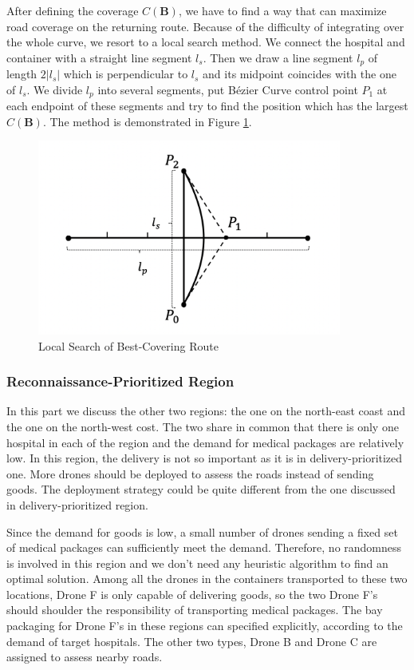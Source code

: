 \documentclass{mcmthesis}
\begin{document}
After defining the coverage $C(\mathbf{B})$, we have to find a way that can maximize road coverage on the returning route. Because of the difficulty of integrating over the whole curve, we resort to a local search method. We connect the hospital and container with a straight line segment $l_s$. Then we draw a line segment $l_p$ of length $2|l_s|$ which is perpendicular to $l_s$ and its midpoint coincides with the one of $l_s$. We divide $l_p$ into several segments, put B\'{e}zier Curve control point $P_1$ at each endpoint of these segments and try to find the position which has the largest $C(\mathbf{B})$. The method is demonstrated in Figure \ref{Fig:lcsr}.

\begin{figure}[htbp]
    \centering
    \includegraphics[width=10cm]{figures/local_search_route.png}
    \caption{Local Search of Best-Covering Route}
    \label{Fig:lcsr}
\end{figure}

\subsubsection{Reconnaissance-Prioritized Region}
In this part we discuss the other two regions: the one on the north-east coast and the one on the north-west cost. The two share in common that there is only one hospital in each of the region and the demand for medical packages are relatively low. In this region, the delivery is not so important as it is in delivery-prioritized one. More drones should be deployed to assess the roads instead of sending goods. The deployment strategy could be quite different from the one discussed in delivery-prioritized region.

Since the demand for goods is low, a small number of drones sending a fixed set of medical packages can sufficiently meet the demand. Therefore, no randomness is involved in this region and we don't need any heuristic algorithm to find an optimal solution. Among all the drones in the containers transported to these two locations, Drone F is only capable of delivering goods, so the two Drone F's should shoulder the responsibility of transporting medical packages. The bay packaging for Drone F's in these regions can specified explicitly, according to the demand of target hospitals. The other two types, Drone B and Drone C are assigned to assess nearby roads. 
\end{document}

